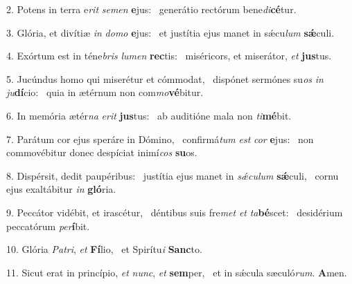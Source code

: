 2. Potens in terra e\textit{rit} \textit{se}\textit{men} \textbf{e}jus: \ast\  generátio rectórum bene\textit{di}\textbf{cé}tur.\

3. Glória, et divítiæ \textit{in} \textit{do}\textit{mo} \textbf{e}jus: \ast\  et justítia ejus manet in sǽcu\textit{lum} \textbf{sǽ}culi.\

4. Exórtum est in téne\textit{bris} \textit{lu}\textit{men} \textbf{rec}tis: \ast\  miséricors, et miserátor, \textit{et} \textbf{jus}tus.\

5. Jucúndus homo qui miserétur et cómmodat, \dag\  dispónet sermónes su\textit{os} \textit{in} \textit{ju}\textbf{dí}cio: \ast\  quia in ætérnum non com\textit{mo}\textbf{vé}bitur.\

6. In memória ætér\textit{na} \textit{e}\textit{rit} \textbf{jus}tus: \ast\  ab auditióne mala non \textit{ti}\textbf{mé}bit.\

7. Parátum cor ejus speráre in Dómino, \dag\  confirmá\textit{tum} \textit{est} \textit{cor} \textbf{e}jus: \ast\  non commovébitur donec despíciat inimí\textit{cos} \textbf{su}os.\

8. Dispérsit, dedit paupéribus: \dag\  justítia ejus manet in \textit{sǽ}\textit{cu}\textit{lum} \textbf{sǽ}culi, \ast\  cornu ejus exaltábitur \textit{in} \textbf{gló}ria.\

9. Peccátor vidébit, et irascétur, \dag\  déntibus suis fre\textit{met} \textit{et} \textit{ta}\textbf{bé}scet: \ast\  desidérium peccatórum \textit{per}\textbf{í}bit.\

10. Glória \textit{Pa}\textit{tri}, \textit{et} \textbf{Fí}lio, \ast\  et Spirítu\textit{i} \textbf{Sanc}to.\

11. Sicut erat in princípio, \textit{et} \textit{nunc}, \textit{et} \textbf{sem}per, \ast\  et in sǽcula sæculó\textit{rum}. \textbf{A}men.\


